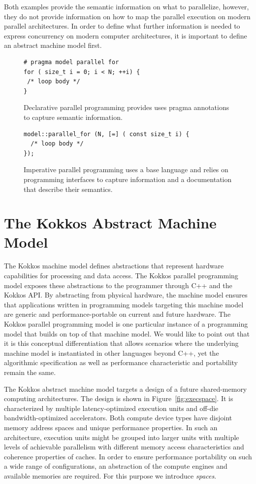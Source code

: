 Both examples provide the semantic information on what to parallelize, however, they do not provide information on how to map the parallel execution on modern parallel architectures. In order to define what further information is needed to express concurrency on modern computer architectures, it is important to define an abstract machine model first.

\begin{figure}
\begin{Verbatim}[frame=leftline]
# pragma model parallel for
for ( size_t i = 0; i < N; ++i) {
 /* loop body */
}
\end{Verbatim}
\caption{Declarative parallel programming provides uses pragma annotations to capture semantic information.}
\label{figOMPLike}
\end{figure}

\begin{figure}
\begin{Verbatim}[frame=leftline]
model::parallel_for (N, [=] ( const size_t i) {
  /* loop body */
});
\end{Verbatim}
\caption{Imperative parallel programming uses a base language and relies on programming interfaces to capture information and a documentation that describe their semantics.}
\label{figKokkosLike}
\end{figure}

\section{The Kokkos Abstract Machine Model}\label{chap:kokkosMM}

The Kokkos machine model defines abstractions that represent hardware capabilities for processing and data access. The Kokkos parallel programming model exposes these abstractions to the programmer through C++ and the Kokkos API. By abstracting from physical hardware, the machine model ensures that applications written in programming models targeting this machine model are generic and performance-portable on current and future hardware. The Kokkos parallel programming model is one particular instance of a programming model that builds on top of that machine model. We would like to point out that it is this conceptual differentiation that allows scenarios where the underlying machine model is instantiated in other languages beyond C++, yet the algorithmic specification as well as performance characteristic and portability remain the same. 

The Kokkos abstract machine model targets a design of a future shared-memory computing architectures. The design is shown in Figure~\ref{fig:execspace}. It is characterized by multiple latency-optimized execution units and off-die bandwidth-optimized accelerators. Both compute device types have disjoint memory address spaces and unique performance properties. In such an architecture,   execution units might be grouped into larger units with multiple levels of achievable parallelism with different memory access characteristics and coherence properties of caches. In order to ensure performance portability on such a wide range of configurations, an abstraction of the compute engines and available memories are required. For this purpose we introduce \emph{spaces}.

